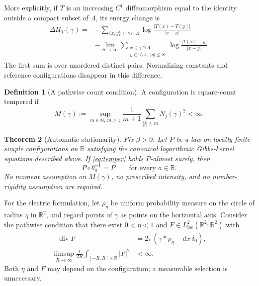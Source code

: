 \documentclass[11pt,reqno]{amsart}
\numberwithin{equation}{section}
\newtheorem{theorem}{Theorem}[section]
\theoremstyle{definition}
\newtheorem{definition}[theorem]{Definition}
\theoremstyle{remark}
\newcommand{\R}{\mathbb R}
\newcommand{\N}{\mathbb N}
\newcommand{\1}{\mathbf1}
\DeclareMathOperator{\diver}{div}
\begin{document}
More explicitly, if $T$ is an increasing $C^1$ diffeomorphism equal to
the identity outside a compact subset of $\Lambda$, its energy change is
\begin{equation}\label{eq:move}
\begin{split}
\Delta H_T(\gamma)={}&
-\sum_{\{x,y\}\subset\gamma\cap\Lambda}
 \log\frac{|T(x)-T(y)|}{|x-y|}\\
&-\lim_{S\to\infty}
 \sum_{\substack{x\in\gamma\cap\Lambda\\
                   y\in\gamma\setminus\Lambda,\ |y|\le S}}
 \log\frac{|T(x)-y|}{|x-y|}.
\end{split}
\end{equation}
The first sum is over unordered distinct pairs. Normalizing constants
and reference configurations disappear in this difference.

\begin{definition}[A pathwise count condition]\label{def:temper}
A configuration is square-count tempered if
\begin{equation}\label{eq:temper}
M(\gamma):=\sup_{m\in\N,\ m\ge1}
\frac{1}{m+1}\sum_{|j|\le m}N_j(\gamma)^2<\infty.
\end{equation}
\end{definition}

\begin{theorem}[Automatic stationarity]\label{thm:auto}
Fix $\beta>0$. Let $P$ be a law on locally finite simple configurations
on $\R$ satisfying the canonical logarithmic Gibbs-kernel equations
described above. If \eqref{eq:temper} holds $P$-almost surely, then
\[
P\circ\theta_a^{-1}=P\qquad\text{for every }a\in\R.
\]
No moment assumption on $M(\gamma)$, no prescribed intensity, and no
number-rigidity assumption are required.
\end{theorem}

For the electric formulation, let $\rho_\eta$ be uniform probability
measure on the circle of radius $\eta$ in $\R^2$, and regard points of
$\gamma$ as points on the horizontal axis. Consider the pathwise condition
that there exist $0<\eta<1$ and $F\in L^2_{\mathrm{loc}}(\R^2;\R^2)$ with
\begin{align}
-\diver F&=2\pi(\gamma*\rho_\eta-dx\,\delta_0),\label{eq:div}\\
\limsup_{R\to\infty}\frac1{2R}
\int_{[-R,R]\times\R}|F|^2&<\infty.\label{eq:field}
\end{align}
Both $\eta$ and $F$ may depend on the configuration; a measurable
selection is unnecessary.
\end{document}
